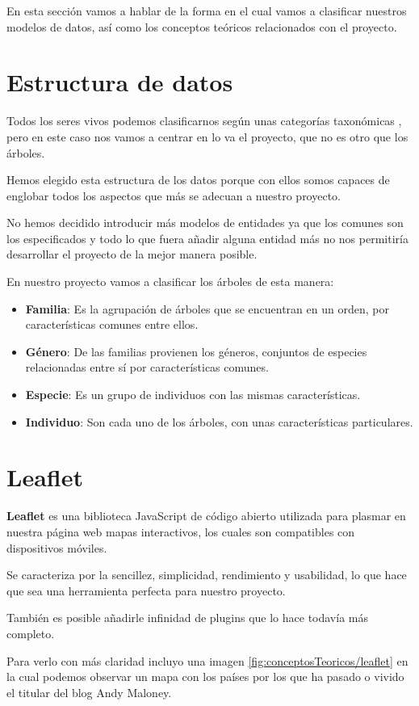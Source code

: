 
En esta sección vamos a hablar de la forma en el cual vamos a clasificar nuestros modelos de datos, así como los conceptos teóricos relacionados con el proyecto.

\section{Estructura de datos}

Todos los seres vivos podemos clasificarnos según unas categorías taxonómicas \cite{CategoriaTaxonomica}, pero en este caso nos vamos a centrar en lo va el proyecto, que no es otro que los árboles.

Hemos elegido esta estructura de los datos porque con ellos somos capaces de englobar todos los aspectos que más se adecuan a nuestro proyecto.

No hemos decidido introducir más modelos de entidades ya que los comunes son los especificados y todo lo que fuera añadir alguna entidad más no nos permitiría desarrollar el proyecto de la mejor manera posible.

En nuestro proyecto vamos a clasificar los árboles de esta manera:
\begin{itemize}
	\item \textbf{Familia}: Es la agrupación de árboles que se encuentran en un orden, por características comunes entre ellos.
	\item \textbf{Género}: De las familias provienen los géneros, conjuntos de especies relacionadas entre sí por características comunes.
	\item \textbf{Especie}: Es un grupo de individuos con las mismas características.
	\item \textbf{Individuo}: Son cada uno de los árboles, con unas características particulares.
\end{itemize}

\section{Leaflet}

\textbf{Leaflet} \cite{leaflet} es una biblioteca JavaScript de código abierto utilizada para plasmar en nuestra página web mapas interactivos, los cuales son compatibles con dispositivos móviles.

Se caracteriza por la sencillez, simplicidad, rendimiento y usabilidad, lo que hace que sea una herramienta perfecta para nuestro proyecto.

También es posible añadirle infinidad de plugins que lo hace todavía más completo.

Para verlo con más claridad incluyo una imagen \ref{fig:conceptosTeoricos/leaflet} en la cual podemos observar un mapa con los países por los que ha pasado o vivido el titular del blog Andy Maloney.


